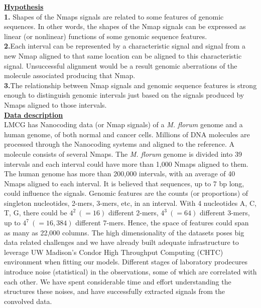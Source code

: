 \documentclass[12pt]{extarticle} %
\begin{document}
\noindent
{\underline{\bf{Hypothesis}}}\\
{\bf{1.}} Shapes of the Nmaps signals are related to some features of genomic sequences. In other words, the shapes of the Nmap signals can be expressed as linear (or nonlinear) functions of some genomic sequence features. \\
{\bf{2.}}Each interval can be represented by a characteristic signal and signal from a new Nmap aligned to that same location can be aligned to this characteristic signal. Unsuccessful alignment would be a result genomic aberrations of the molecule associated producing that Nmap.\\
{\bf{3.}}The relationship between Nmap signals and genomic sequence features is strong enough to distinguish genomic intervals just based on the signals produced by Nmaps aligned to those intervals. \\
\noindent
{\underline{\bf{Data description}}}\\
LMCG has Nanocoding data (or Nmap signals) of a {\it{M. florum}} genome and a human genome, of both normal and cancer cells. Millions of DNA molecules are processed through the Nanocoding systems and aligned to the reference. A molecule consists of several Nmaps. The {\it{M. florum}} genome is divided into 39 intervals and each interval could have more than 1,000 Nmaps aligned to them. The human genome has more than 200,000 intervals, with an average of 40 Nmaps aligned to each interval. It is believed that sequences, up to 7 bp long, could influence the signals. Genomic features are the counts (or proportions) of singleton nucleotides, 2-mers, 3-mers, etc, in an interval. With 4 nucleotides A, C, T, G, there could be $4^2\ (=16)$ different 2-mers, $4^3 \ (= 64)$ different 3-mers, up to $4^7\ (=16,384)$ different 7-mers. Hence, the space of features could span as many as 22,000 columns. The high dimensionality of the datasets poses big data related challenges and we have already built adequate infrastructure to leverage UW Madison's Condor High Throughput Computing (CHTC) environment when fitting our models. Different stages of laboratory prodecures introduce noise (statistical) in the observations, some of which are correlated with each other. We have spent considerable time and effort understanding the structures these noises, and have successfully extracted signals from the convolved data. 
\end{document}
